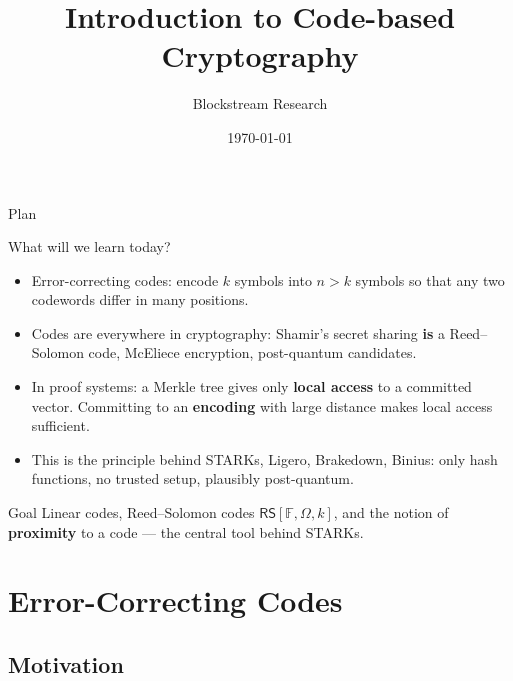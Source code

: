 \documentclass{zkdl-presentation-template}
\title[Code-based Cryptography]{\textbf{Introduction to Code-based Cryptography}}
\author{Blockstream Research}
\date{\today}
\begin{document}
    \maketitleframe

    \begin{frame}{Plan}
      \tableofcontents[hideallsubsections]
    \end{frame}

    \begin{frame}{What will we learn today?}
        \begin{itemize}
            \item Error-correcting codes: encode $k$ symbols into $n > k$ symbols so that any two codewords differ in many positions.\pause
            \item Codes are everywhere in cryptography: Shamir's secret sharing \textbf{is} a Reed--Solomon code, McEliece encryption, post-quantum candidates.\pause
            \item In proof systems: a Merkle tree gives only \textbf{local access} to a committed vector. Committing to an \textbf{encoding} with large distance makes local access sufficient.\pause
            \item This is the principle behind STARKs, Ligero, Brakedown, Binius: only hash functions, no trusted setup, plausibly post-quantum.
        \end{itemize}
        \pause

        \begin{remarkblock}{Goal}
            Linear codes, Reed--Solomon codes $\mathsf{RS}[\mathbb{F},\Omega,k]$, and the notion of \textbf{proximity} to a code --- the central tool behind STARKs.
        \end{remarkblock}
    \end{frame}

    \section{Error-Correcting Codes}

    \subsection{Motivation}
\end{document}
